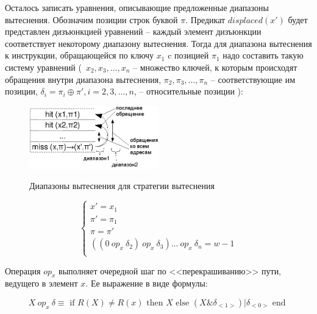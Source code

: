 Осталось записать уравнения, описывающие предложенные диапазоны
вытеснения. Обозначим позиции строк буквой $\pi$. Предикат $displaced(x')$ будет
представлен дизъюнкцией уравнений -- каждый элемент дизъюнкции
соответствует некоторому диапазону вытеснения. Тогда для диапазона
вытеснения к инструкции, обращающейся по ключу $x_1$ c позицией
$\pi_1$ надо составить такую систему уравнений (~$x_2, x_3, ...,
x_n$ -- множество ключей, к которым происходят обращения внутри
диапазона вытеснения, $\pi_2, \pi_3, ..., \pi_n$ -- соответствующие
им позиции, $\delta_i = \pi_i \oplus \pi', i = 2,3,\dots,n$, --
относительные позиции ):

\begin{figure}[h] \center
  \includegraphics[width=0.5\textwidth]{2.theor/plru-ranges}\\
  \caption{Диапазоны вытеснения для стратегии вытеснения \PseudoLRU}
\end{figure}

$$
\left\{
\begin{array}{l}
x' = x_1\\
\pi' = \pi_1\\
\pi = \pi'\\
((0~op_x~\delta_2)~op_x~\delta_3) ... ~op_x~\delta_n  = w-1\\
\end{array}
\right.
$$

Операция $op_x$ выполняет очередной шаг по <<перекрашиванию>> пути,
ведущего в элемент $x$. Ее выражение в виде формулы:

$$X~op_x~\delta \equiv \mbox{~if~} R(X) \neq R(x) \mbox{~then~} X \mbox{~else~}
(X \&
\delta_{<1>}) | \delta_{<0>} \mbox{~end~}$$

